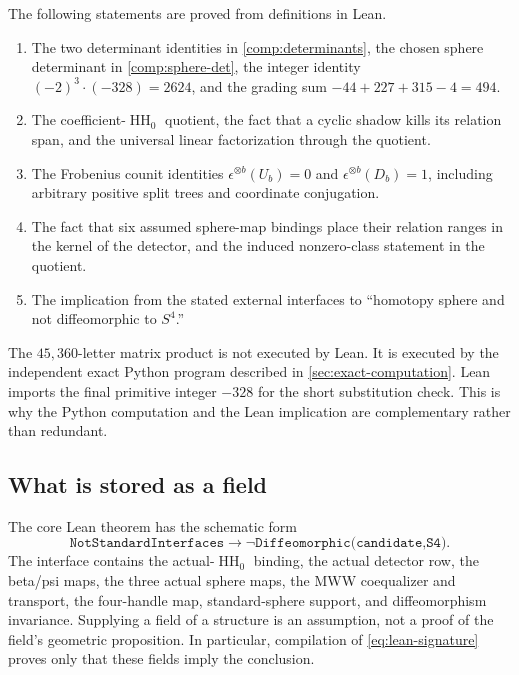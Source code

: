 \documentclass[10pt,reqno]{amsart}
\theoremstyle{definition}
\theoremstyle{remark}
\newcommand{\HH}{\operatorname{HH}}
\begin{document}
The following statements are proved from definitions in Lean.

\begin{enumerate}
\item The two determinant identities in \cref{comp:determinants}, the chosen
  sphere determinant in \cref{comp:sphere-det}, the integer identity
  $(-2)^3\cdot(-328)=2624$, and the grading sum $-44+227+315-4=494$.
\item The coefficient-$\HH_0$ quotient, the fact that a cyclic shadow kills
  its relation span, and the universal linear factorization through the
  quotient.
\item The Frobenius counit identities
  $\epsilon^{\otimes b}(U_b)=0$ and
  $\epsilon^{\otimes b}(D_b)=1$, including arbitrary positive split trees and
  coordinate conjugation.
\item The fact that six assumed sphere-map bindings place their relation
  ranges in the kernel of the detector, and the induced nonzero-class
  statement in the quotient.
\item The implication from the stated external interfaces to
  ``homotopy sphere and not diffeomorphic to $S^4$.''
\end{enumerate}

The $45{,}360$-letter matrix product is not executed by Lean.  It is executed
by the independent exact Python program described in
\cref{sec:exact-computation}.  Lean imports the final primitive integer
$-328$ for the short substitution check.  This is why the Python computation
and the Lean implication are complementary rather than redundant.

\subsection{What is stored as a field}

The core Lean theorem has the schematic form
\begin{equation}\label{eq:lean-signature}
\texttt{NotStandardInterfaces}\longrightarrow
\neg\texttt{Diffeomorphic(candidate,S4)}.
\end{equation}
The interface contains the actual-$\HH_0$ binding, the actual detector row,
the beta/psi maps, the three actual sphere maps, the MWW coequalizer and
transport, the four-handle map, standard-sphere support, and diffeomorphism
invariance.  Supplying a field of a structure is an assumption, not a proof
of the field's geometric proposition.  In particular, compilation of
\cref{eq:lean-signature} proves only that these fields imply the conclusion.
\end{document}
